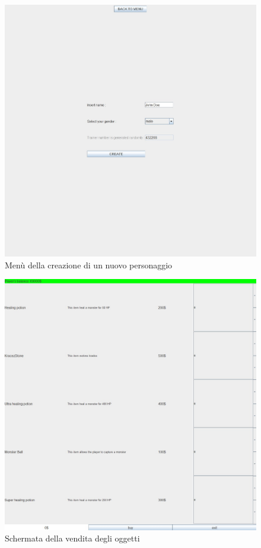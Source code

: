 \newcommand\x{0.4}

\begin{figure}[H]
\centering
\includegraphics[scale=\x]{Screenshot/start_menu.jpg}
\caption{Menù della creazione di un nuovo personaggio}
\label{img:menu}
\end{figure}

\begin{figure}[H]
\centering
\includegraphics[scale=\x]{Screenshot/merchant.jpg}
\caption{Schermata della vendita degli oggetti}
\label{img:mercante}
\end{figure}

